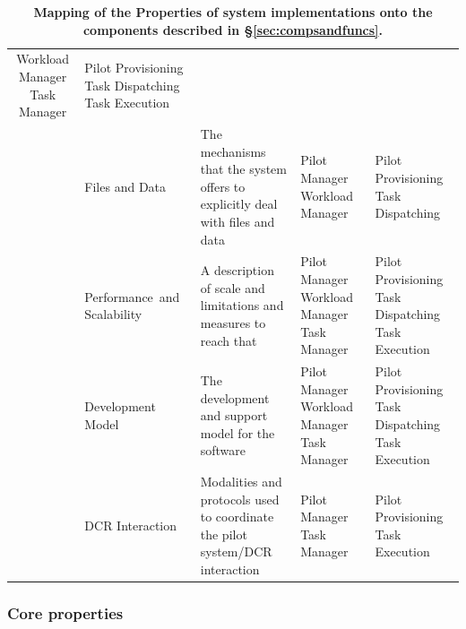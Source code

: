 \documentclass{sig-alternate}
\begin{document}
\begin{table}
\begin{tabular}{c|p{3.6cm}|p{5cm}|p{2.7cm}|p{2.7cm}|}
  Workload Manager \newline
  Task Manager                       &
Pilot Provisioning \newline
  Task Dispatching \newline
  Task Execution \\
\cline{2-5}
                                     &
Files and Data                       &
The mechanisms that the system offers to explicitly deal with files and data &
Pilot Manager      \newline
   Workload Manager                  &
Pilot Provisioning \newline
  Task Dispatching \\
\cline{2-5}
                                     &
Performance~and    \newline
  Scalability                        &
A description of scale and limitations and measures to reach that &
Pilot Manager      \newline
  Workload Manager \newline
  Task Manager                       &
Pilot Provisioning \newline
  Task Dispatching \newline
  Task Execution \\
\cline{2-5}
                                     &
Development Model                    &
The development and support model for the software &
Pilot Manager      \newline
  Workload Manager \newline
  Task Manager                       &
Pilot Provisioning \newline
  Task Dispatching \newline
  Task Execution \\
\cline{2-5}
                                &
DCR Interaction                 &
Modalities and protocols used to coordinate the pilot system/DCR interaction &
Pilot Manager      \newline
  Task Manager                  &
Pilot Provisioning \newline
  Task Execution \\
\hline
\end{tabular}
\caption{\textbf{Mapping of the Properties of \pilot system implementations
onto the components described in \S\ref{sec:compsandfuncs}.}}
\label{table:property_component_mapping}
\end{table}

\subsubsection{Core properties}
\label{sec:coreprops}
\end{document}
